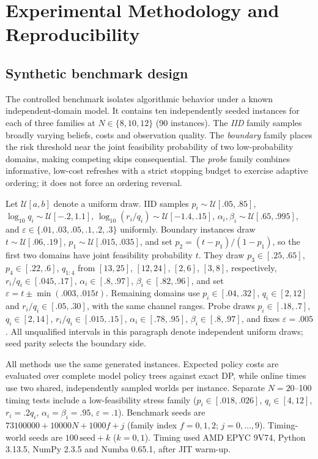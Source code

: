 \section{Experimental Methodology and Reproducibility}
\label{app:experiments}
\subsection{Synthetic benchmark design}
The controlled benchmark isolates algorithmic behavior under a known independent-domain model. It contains ten independently seeded instances for each of three families at $N\in\{8,10,12\}$ (90 instances). The \emph{IID} family samples broadly varying beliefs, costs and observation quality. The \emph{boundary} family places the risk threshold near the joint feasibility probability of two low-probability domains, making competing skips consequential. The \emph{probe} family combines informative, low-cost refreshes with a strict stopping budget to exercise adaptive ordering; it does not force an ordering reversal.

Let $\mathcal U[a,b]$ denote a uniform draw. IID samples $p_i\sim\mathcal U[.05,.85]$, $\log_{10}q_i\sim\mathcal U[-.2,1.1]$, $\log_{10}(r_i/q_i)\sim\mathcal U[-1.4,.15]$, $\alpha_i,\beta_i\sim\mathcal U[.65,.995]$, and $\varepsilon\in\{.01,.03,.05,.1,.2,.3\}$ uniformly. Boundary instances draw $t\sim\mathcal U[.06,.19]$, $p_1\sim\mathcal U[.015,.035]$, and set $p_2=(t-p_1)/(1-p_1)$, so the first two domains have joint feasibility probability $t$. They draw $p_3\in[.25,.65]$, $p_4\in[.22,.6]$, $q_{1:4}$ from $[13,25]$, $[12,24]$, $[2,6]$, $[3,8]$, respectively, $r_i/q_i\in[.045,.17]$, $\alpha_i\in[.8,.97]$, $\beta_i\in[.82,.96]$, and set $\varepsilon=t\pm\min(.003,.015t)$. Remaining domains use $p_i\in[.04,.32]$, $q_i\in[2,12]$ and $r_i/q_i\in[.05,.30]$, with the same channel ranges. Probe draws $p_i\in[.18,.7]$, $q_i\in[2,14]$, $r_i/q_i\in[.015,.15]$, $\alpha_i\in[.78,.95]$, $\beta_i\in[.8,.97]$, and fixes $\varepsilon=.005$. All unqualified intervals in this paragraph denote independent uniform draws; seed parity selects the boundary side.

All methods use the same generated instances. Expected policy costs are evaluated over complete model policy trees against exact DP, while online times use two shared, independently sampled worlds per instance. Separate $N=20$--100 timing tests include a low-feasibility stress family ($p_i\in[.018,.026]$, $q_i\in[4,12]$, $r_i=.2q_i$, $\alpha_i=\beta_i=.95$, $\varepsilon=.1$). Benchmark seeds are $73100000+10000N+1000f+j$ (family index $f=0,1,2$; $j=0,\ldots,9$). Timing-world seeds are $100\,\mathrm{seed}+k$ ($k=0,1$). Timing used AMD EPYC 9V74, Python 3.13.5, NumPy 2.3.5 and Numba 0.65.1, after JIT warm-up.

